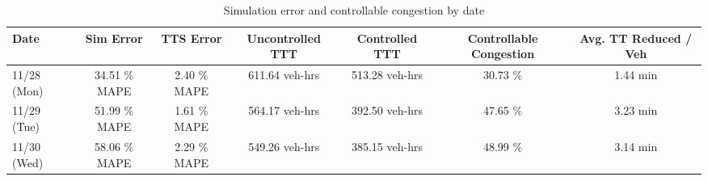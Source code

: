 \begin{table}[ht]
  \centering
  \caption{Simulation error and controllable congestion by date} \label{tab:cc_static}
  \begin{tabular}{lcccccc}
  \hline
  \textbf{Date} & \textbf{Sim Error} & \textbf{TTS Error} & \textbf{Uncontrolled TTT} & \textbf{Controlled TTT} & \textbf{Controllable Congestion} & \textbf{Avg. TT Reduced / Veh} \\
  \hline
  11/28 (Mon) & 34.51 \% MAPE & 2.40 \% MAPE & 611.64 veh-hrs & 513.28 veh-hrs & 30.73 \% & 1.44 min \\
11/29 (Tue) & 51.99 \% MAPE & 1.61 \% MAPE & 564.17 veh-hrs & 392.50 veh-hrs & 47.65 \% & 3.23 min \\
11/30 (Wed) & 58.06 \% MAPE & 2.29 \% MAPE & 549.26 veh-hrs & 385.15 veh-hrs & 48.99 \% & 3.14 min \\
  \hline
  \end{tabular} \end{table}
